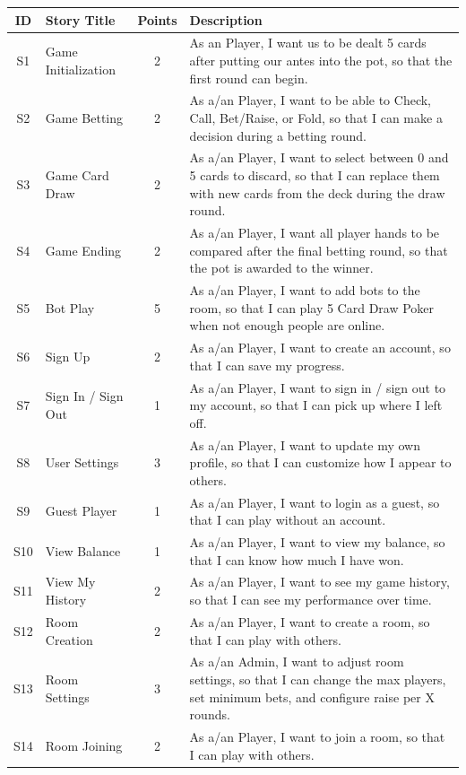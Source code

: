 \documentclass{article}
\begin{document}
\begin{longtable}[h]{c l c p{10cm}}
\hline
\textbf{ID} & \textbf{Story Title} & \textbf{Points} & \textbf{Description} \\
\hline
S1 & Game Initialization & 2 & As an Player, I want us to be dealt 5 cards after putting our antes into the pot, so that the first round can begin. \\ \hline
S2 & Game Betting & 2 & As a/an Player, I want to be able to Check, Call, Bet/Raise, or Fold, so that I can make a decision during a betting round. \\ \hline
S3 & Game Card Draw & 2 & As a/an Player, I want to select between 0 and 5 cards to discard, so that I can replace them with new cards from the deck during the draw round. \\ \hline
S4 & Game Ending & 2 & As a/an Player, I want all player hands to be compared after the final betting round, so that the pot is awarded to the winner. \\ \hline
S5 & Bot Play & 5 & As a/an Player, I want to add bots to the room, so that I can play 5 Card Draw Poker when not enough people are online. \\ \hline
S6 & Sign Up & 2 & As a/an Player, I want to create an account, so that I can save my progress. \\ \hline
S7 & Sign In / Sign Out & 1 & As a/an Player, I want to sign in / sign out to my account, so that I can pick up where I left off. \\ \hline
S8 & User Settings & 3 & As a/an Player, I want to update my own profile, so that I can customize how I appear to others. \\ \hline
S9 & Guest Player & 1 & As a/an Player, I want to login as a guest, so that I can play without an account. \\ \hline
S10 & View Balance & 1 & As a/an Player, I want to view my balance, so that I can know how much I have won. \\ \hline
S11 & View My History & 2 & As a/an Player, I want to see my game history, so that I can see my performance over time. \\ \hline
S12 & Room Creation & 2 & As a/an Player, I want to create a room, so that I can play with others. \\ \hline
S13 & Room Settings & 3 & As a/an Admin, I want to adjust room settings, so that I can change the max players, set minimum bets, and configure raise per X rounds. \\ \hline
S14 & Room Joining & 2 & As a/an Player, I want to join a room, so that I can play with others. \\ \hline

\end{longtable}
\end{document}
